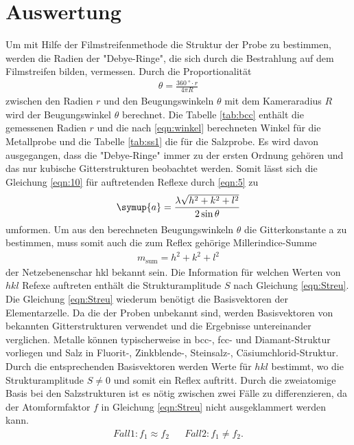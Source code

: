 \section{Auswertung}
\label{sec:Auswertung}

Um mit Hilfe der Filmstreifenmethode die Struktur der Probe zu bestimmen, werden
die Radien der "Debye-Ringe", die sich durch die Bestrahlung auf dem Filmstreifen bilden,
vermessen. Durch die Proportionalität
\begin{align}
\theta=\frac{\SI{360}{\degree}\cdot r}{4 \pi R } \label{eqn:winkel}
\end{align}
zwischen den Radien $r$ und den Beugungswinkeln $\theta$
mit dem Kameraradius $R$ wird der Beugungswinkel $\theta$ berechnet.
Die Tabelle \ref{tab:bcc} enthält die gemessenen Radien $r$
und die nach \eqref{eqn:winkel} berechneten Winkel
für die Metallprobe und die Tabelle \ref{tab:ss1} die für die Salzprobe.
Es wird davon ausgegangen, dass die "Debye-Ringe" immer zu der ersten Ordnung gehören
und das nur kubische Gitterstrukturen beobachtet werden.
Somit lässt sich die Gleichung \ref{eqn:10} für auftretenden
Reflexe durch \eqref{eqn:5} zu
\begin{align}
\symup{a} = \frac{\lambda \sqrt{h^2 +k^2+l^2}}{2\sin{\theta}} \label{eqn:Gitterkonst}
\end{align}
umformen.
Um aus den berechneten Beugungswinkeln $\theta$ die Gitterkonstante a
zu bestimmen, muss somit auch die zum Reflex gehörige Millerindice-Summe
\begin{align*}
  m_{\mathrm{sum}}=h^{2} + k^{2} + l^{2}
\end{align*}
der Netzebenenschar hkl bekannt sein.
Die Information für welchen Werten von $hkl$ Refexe auftreten
enthält die Strukturamplitude $S$ nach Gleichung \eqref{eqn:Streu}.
Die Gleichung \eqref{eqn:Streu} wiederum benötigt die Basisvektoren
der Elementarzelle. Da die der Proben unbekannt sind, werden
Basisvektoren von bekannten Gitterstrukturen verwendet und die Ergebnisse
untereinander verglichen. Metalle können typischerweise in
 bcc-, fcc- und Diamant-Struktur
vorliegen und Salz in Fluorit-, Zinkblende-,
Steinsalz-, Cäsiumchlorid-Struktur.
Durch die entsprechenden Basisvektoren
werden Werte für $hkl$ bestimmt, wo die Strukturamplitude
$S\neq0$ und somit ein Reflex auftritt.
Durch die zweiatomige Basis bei den
Salzstrukturen ist es nötig zwischen zwei Fälle zu differenzieren,
da der Atomformfaktor $f$ in Gleichung
\eqref{eqn:Streu} nicht ausgeklammert werden kann.
\begin{align*}
  Fall 1: f_1\approx f_2  & & Fall 2: f_1\neq f_2.
\end{align*}
